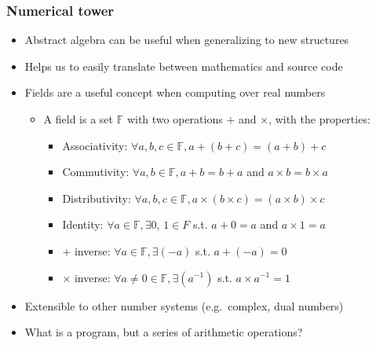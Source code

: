 \documentclass{beamer}
\begin{document}


    \begin{frame}
        \frametitle{Numerical tower}
        \begin{itemize}
            \item Abstract algebra can be useful when generalizing to new structures
            \item Helps us to easily translate between mathematics and source code
            \item Fields are a useful concept when computing over real numbers
            \begin{itemize}
                \item A field is a set $\mathbb{F}$ with two operations $+$ and $\times$, with the properties:
                \begin{itemize}
                    \item Associativity: $\forall a, b, c \in \mathbb{F}, a + (b + c) = (a + b) + c$
                    \item Commutivity: $\forall a, b \in \mathbb{F}, a + b = b + a$ and $a\times b = b\times a$
                    \item Distributivity: $\forall a, b, c \in \mathbb{F}, a \times (b \times c) = (a \times b) \times c$
                    \item Identity: $\forall a \in \mathbb{F}, \exists 0$, $ 1 \in F$ s.t. $a + 0 = a$ and $a\times 1= a$
                    \item $+$ inverse: $\forall a\in \mathbb{F}, \exists (-a)$ s.t. $a + (-a) = 0$
                    \item $\times$ inverse: $\forall a\neq 0 \in \mathbb{F}, \exists (a^{-1})$ s.t. $a \times a^{-1} = 1$
                \end{itemize}
            \end{itemize}
            \item Extensible to other number systems (e.g.\ complex, dual numbers)
            \item What is a program, but a series of arithmetic operations?
        \end{itemize}
    \end{frame}
\end{document}
